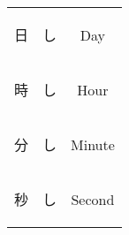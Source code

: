 \begin{center}
\begin{table}[H]
\begin{tabular}{ccc}
		{\begin{CJK}{UTF8}{min} 日 \end{CJK}} & {\begin{CJK}{UTF8}{min} し \end{CJK}} & Day \\
		{\begin{CJK}{UTF8}{min} 時 \end{CJK}} & {\begin{CJK}{UTF8}{min} し \end{CJK}} & Hour \\
		{\begin{CJK}{UTF8}{min} 分 \end{CJK}} & {\begin{CJK}{UTF8}{min} し \end{CJK}} & Minute \\
		{\begin{CJK}{UTF8}{min} 秒 \end{CJK}} & {\begin{CJK}{UTF8}{min} し \end{CJK}} & Second \\
		\bottomrule
	\end{tabular}
\end{table}


\end{center}



